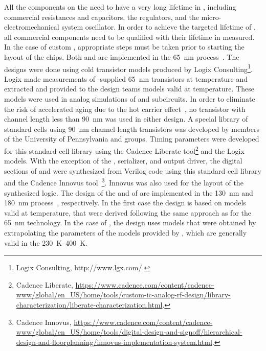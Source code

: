 All the components on the  need to have a very long lifetime
in , including commercial resistances and capacitors, the
 regulators, and the micro-electromechanical system oscillator.
In order to achieve the targeted lifetime of \dunelifetime{}, all commercial components 
need to be qualified with %
their lifetime in  %
measured. 
In the case of custom , appropriate steps must be taken prior 
to starting the layout of the chips. Both  and 
 are implemented in the  \SI{65}{nm}  
process~\cite{TSMC65}. The designs were done using cold transistor models 
produced by Logix Consulting\footnote{Logix\texttrademark{} Consulting, http://www.lgx.com/.}.  Logix made measurements of 
-supplied  \SI{65}{nm} transistors at \lntwo 
temperature and extracted and provided to the design teams  
models valid at \lntwo temperature.  These models were used in 
analog simulations of  and  subcircuits.  
In order to eliminate the risk of accelerated aging due to the hot carrier
effect~\cite{Hot-electron}, no transistor with channel length
less than \SI{90}{nm} was used in either  design.
A special library of standard cells using \SI{90}{nm} channel-length 
transistors was developed by members of the University
of Pennsylvania and  groups. Timing parameters were
developed for this standard cell library using the Cadence Liberate
tool\footnote{Cadence Liberate\texttrademark{}, \url{https://www.cadence.com/content/cadence-www/global/en_US/home/tools/custom-ic-analog-rf-design/library-characterization/liberate-characterization.html}. } 
and the Logix ~\cite{spice} models. With the
exception of the  , 
serializer, and
output driver, the digital sections of  and
 were synthesized from Verilog code using this
standard cell library and the Cadence Innovus tool~\footnote{Cadence Innovus\texttrademark{}, \url{https://www.cadence.com/content/cadence-www/global/en_US/home/tools/digital-design-and-signoff/hierarchical-design-and-floorplanning/innovus-implementation-system.html}.}. 
Innovus was also used for the layout of the synthesized logic.
The design of the   and of 
are implemented in the  \SI{130}{nm} and \SI{180}{nm} 
 process~\cite{TSMC130,TSMC180}, respectively. In the
first case the design is based on  models valid at
\lntwo temperature, that were derived following the same approach
as for the \SI{65}{nm} technology. In the case of , 
the design uses models that were obtained by extrapolating the
parameters of the models provided by , which are 
generally valid in the \SIrange{230}{400}{K}.

